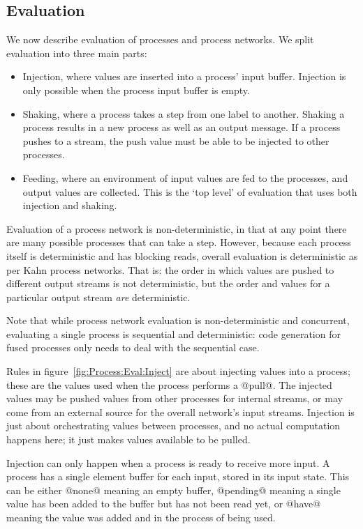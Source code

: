 \subsection{Evaluation}
\label{s:Process:Eval}




We now describe evaluation of processes and process networks.
We split evaluation into three main parts:
\begin{itemize}
\item Injection, where values are inserted into a process' input buffer.
Injection is only possible when the process input buffer is empty.
\item Shaking, where a process takes a step from one label to another.
Shaking a process results in a new process as well as an output message.
If a process pushes to a stream, the push value must be able to be injected to other processes.
\item Feeding, where an environment of input values are fed to the processes, and output values are collected.
This is the `top level' of evaluation that uses both injection and shaking.
\end{itemize}

Evaluation of a process network is non-deterministic, in that at any point there are many possible processes that can take a step.
However, because each process itself is deterministic and has blocking reads, overall evaluation is deterministic as per Kahn process networks.
That is: the order in which values are pushed to different output streams is not deterministic, but the order and values for a particular output stream \emph{are} deterministic.

Note that while process network evaluation is non-deterministic and concurrent, evaluating a single process is sequential and deterministic: code generation for fused processes only needs to deal with the sequential case.

Rules in figure~\ref{fig:Process:Eval:Inject} are about injecting values into a process; these are the values used when the process performs a @pull@.
The injected values may be pushed values from other processes for internal streams, or may come from an external source for the overall network's input streams.
Injection is just about orchestrating values between processes, and no actual computation happens here; it just makes values available to be pulled.

Injection can only happen when a process is ready to receive more input.
A process has a single element buffer for each input, stored in its input state.
This can be either @none@ meaning an empty buffer, @pending@ meaning a single value has been added to the buffer but has not been read yet, or @have@ meaning the value was added and in the process of being used.

